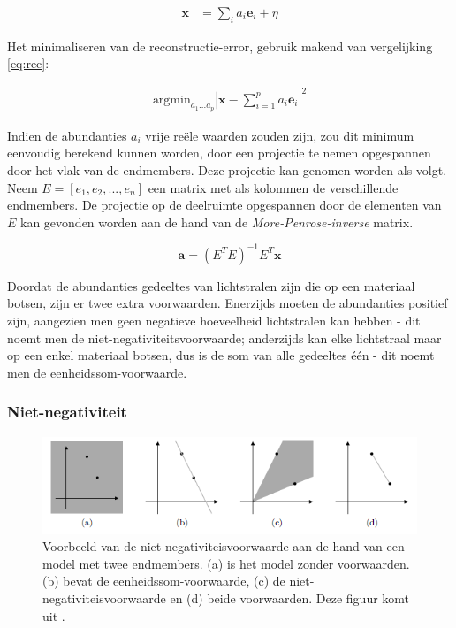 \documentclass[12pt]{report}
\begin{document}
\begin{align}
\bm{x} &= \sum_i a_i \bm{e}_i + \eta
\end{align}

Het minimaliseren van de reconstructie-error, gebruik makend van vergelijking \ref{eq:rec}:

\begin{align}
\text{argmin}_{a_1 ... a_p} \left| \bm{x} - \sum_{i=1}^p a_i \bm{e}_i\right|^2
\end{align}

Indien de abundanties $a_i$ vrije re\"ele waarden zouden zijn, zou dit minimum eenvoudig berekend kunnen worden, door een projectie te nemen opgespannen door het vlak van de endmembers. Deze projectie kan genomen worden als volgt. Neem $E = [e_1,e_2,...,e_n]$ een matrix met als kolommen de verschillende endmembers. De projectie op de deelruimte opgespannen door de elementen van $E$ kan gevonden worden aan de hand van de \textit{More-Penrose-inverse} matrix.

\begin{equation}
\bm{a} = (E^T E)^{-1} E^T \bm{x}
\end{equation}

Doordat de abundanties gedeeltes van lichtstralen zijn die op een materiaal botsen, zijn er twee extra voorwaarden. Enerzijds moeten de abundanties positief zijn, aangezien men geen negatieve hoeveelheid lichtstralen kan hebben - dit noemt men de niet-negativiteitsvoorwaarde; anderzijds kan elke lichtstraal maar op een enkel materiaal botsen, dus is de som van alle gedeeltes \'e\'en - dit noemt men de eenheidssom-voorwaarde.  


\subsubsection{Niet-negativiteit}

\begin{figure}
\includegraphics[width=\textwidth]{nonneg.PNG}
\caption{Voorbeeld van de niet-negativiteisvoorwaarde aan de hand van een model met twee endmembers. (a) is het model zonder voorwaarden. (b) bevat de eenheidssom-voorwaarde, (c) de niet-negativiteisvoorwaarde en (d) beide voorwaarden. Deze figuur komt uit \cite{cursus}. \label{fig:nonneg}}
\end{figure}
\end{document}
